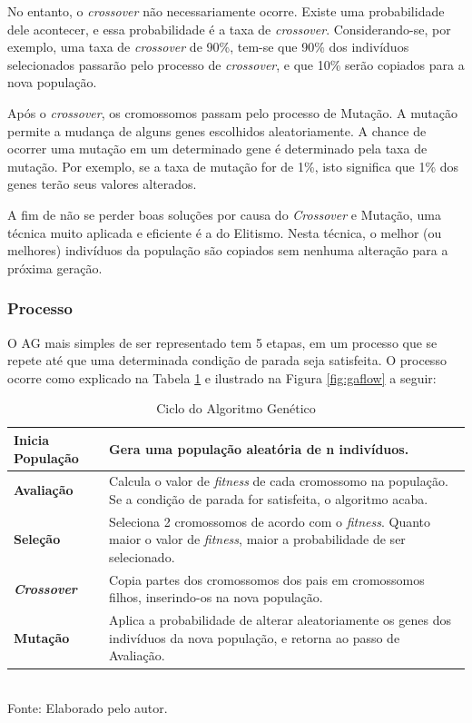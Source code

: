 \documentclass[12pt,a4paper]{article}
\newcommand{\source}[1]{\small Fonte: {#1}}
\begin{document}
	No entanto, o \textit{crossover} não necessariamente ocorre.
	Existe uma probabilidade dele acontecer,
	e essa probabilidade é a taxa de \textit{crossover}.
	Considerando-se, por exemplo, uma taxa de \textit{crossover} de 90\%,
	tem-se que 90\% dos indivíduos selecionados passarão pelo processo de \textit{crossover},
	e que 10\% serão copiados para a nova população.
	
	Após o \textit{crossover},
	os cromossomos passam pelo processo de Mutação.
	A mutação permite a mudança de alguns genes escolhidos aleatoriamente.
	A chance de ocorrer uma mutação em um determinado gene é determinado pela taxa de mutação.
	Por exemplo, se a taxa de mutação for de 1\%,
	isto significa que 1\% dos genes terão seus valores alterados.
	
	A fim de não se perder boas soluções por causa do \textit{Crossover} e Mutação,
	uma técnica muito aplicada e eficiente é a do Elitismo.
	Nesta técnica, o melhor (ou melhores) indivíduos da população são copiados sem nenhuma alteração para a próxima geração.
	
	\FloatBarrier
	\subsubsection{Processo}
	O AG mais simples de ser representado tem 5 etapas,
	em um processo que se repete até que uma determinada condição de parada seja satisfeita.
	O processo ocorre como explicado na Tabela \ref{tab:agCycle} e ilustrado na Figura \ref{fig:gaflow} a seguir:
	
	\begin{table}[h]
		\caption{Ciclo do Algoritmo Genético}
		\centering
		\small
		\renewcommand{\arraystretch}{1.2} %
		\begin{tabular}{>{\centering\arraybackslash}m{3.5cm} m{11.5cm}}
			\hline 
			\textbf{Inicia População} & Gera uma população aleatória de n indivíduos. \\ 
			\hline 
			\textbf{Avaliação} & Calcula o valor de \textit{fitness} de cada cromossomo na população. Se a condição de parada for satisfeita, o algoritmo acaba. \\ 
			\hline 
			\textbf{Seleção} & Seleciona 2 cromossomos de acordo com o \textit{fitness}. Quanto maior o valor de \textit{fitness}, maior a probabilidade de ser selecionado. \\ 
			\hline 
			\textbf{\textit{Crossover}} & Copia partes dos cromossomos dos pais em cromossomos filhos, inserindo-os na nova população. \\ 
			\hline 
			\textbf{Mutação} & Aplica a probabilidade de alterar aleatoriamente os genes dos indivíduos da nova população, e retorna ao passo de Avaliação. \\ 
			\hline 
		\end{tabular}\\
		\vspace{3mm}
		\source{Elaborado pelo autor.}
		\label{tab:agCycle}
	\end{table}
	
\end{document}
